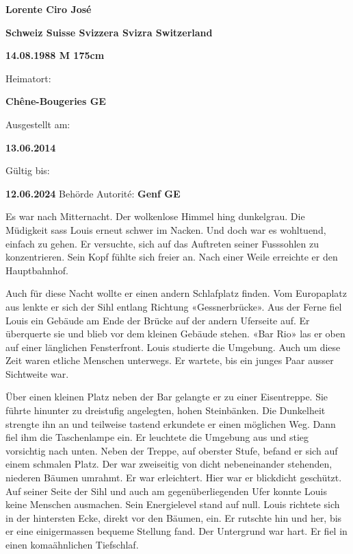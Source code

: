 \sectionbreak


\vspace{\baselineskip}

\textbf{Lorente Ciro José}

\textbf{Schweiz Suisse Svizzera Svizra Switzerland}

\textbf{14.08.1988  \hspace{4mm}  M  \hspace{8mm} 175cm}

Heimatort:

\textbf{Chêne-Bougeries GE}

Ausgestellt am:

\textbf{13.06.2014}

Gültig bis:

\textbf{12.06.2024} \hspace{1cm} Behörde Autorité: \textbf{Genf GE}

\vspace{\baselineskip}

Es war nach Mitternacht. Der wolkenlose Himmel hing dunkelgrau. Die
Müdigkeit sass Louis erneut schwer im Nacken. Und doch war es wohltuend,
einfach zu gehen. Er versuchte, sich auf das Auftreten seiner Fusssohlen
zu konzentrieren. Sein Kopf fühlte sich freier an. Nach einer Weile
erreichte er den Hauptbahnhof.

Auch für diese Nacht wollte er einen andern Schlafplatz finden.
Vom Europaplatz aus lenkte er sich der Sihl entlang Richtung «Gessnerbrücke». 
Aus der Ferne fiel Louis ein Gebäude am Ende der Brücke
auf der andern Uferseite auf. Er überquerte sie und blieb vor dem kleinen Gebäude stehen. «Bar
Rio» las er oben auf einer länglichen Fensterfront. Louis studierte die
Umgebung. Auch um diese Zeit waren etliche Menschen unterwegs.
Er wartete, bis ein junges Paar ausser Sichtweite war. 

Über einen kleinen Platz neben der Bar gelangte er zu einer
Eisentreppe. Sie führte hinunter zu dreistufig angelegten, hohen
Steinbänken. Die Dunkelheit strengte ihn an und teilweise tastend
erkundete er einen möglichen Weg. Dann fiel ihm die Taschenlampe ein.
Er leuchtete die Umgebung aus und stieg vorsichtig nach unten. Neben der
Treppe, auf oberster Stufe, befand er sich auf einem schmalen Platz. Der war 
zweiseitig von dicht nebeneinander stehenden, niederen Bäumen umrahmt. 
Er war erleichtert. Hier war er blickdicht geschützt.
Auf seiner Seite der Sihl und auch am gegenüberliegenden Ufer konnte Louis
keine Menschen ausmachen. 
Sein Energielevel stand auf null. 
Louis richtete sich in der hintersten Ecke, direkt vor den Bäumen, ein.
Er rutschte hin und her, bis er eine einigermassen bequeme Stellung
fand. Der Untergrund war hart. Er fiel in einen komaähnlichen Tiefschlaf.

